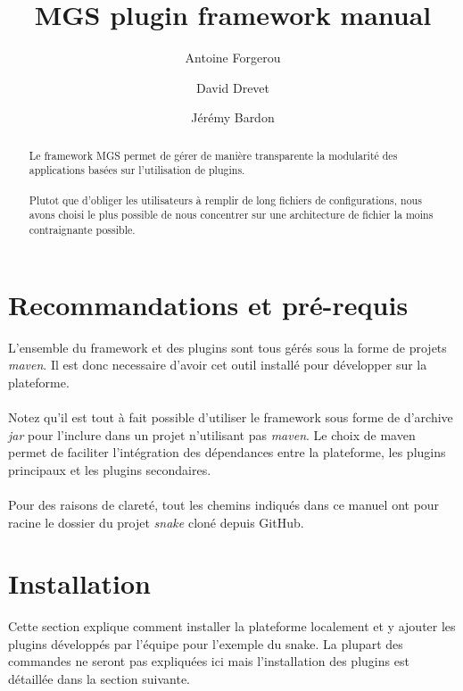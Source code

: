 \documentclass[12pt,a4paper]{article}
\title{MGS plugin framework manual}
\author{Antoine Forgerou \and David Drevet \and Jérémy Bardon}
\date{}
\begin{document}
	\renewcommand{\contentsname}{Sommaire}
	\renewcommand{\arraystretch}{1.8}
	\maketitle	
	
	\vspace{0.80cm}
	\tableofcontents	

	\thispagestyle{empty}	
	\setcounter{page}{0}
	\newpage
	
\begin{abstract}
Le framework MGS permet de gérer de manière transparente la modularité des 
applications basées sur l'utilisation de plugins. 
\\\\
Plutot que d'obliger les utilisateurs à remplir de long fichiers de configurations, 
nous avons choisi le plus possible de nous concentrer sur une architecture de 
fichier la moins contraignante possible.
\end{abstract}

\section{Recommandations et pré-requis}
L'ensemble du framework et des plugins sont tous gérés sous la forme de projets 
\emph{maven}. Il est donc necessaire d'avoir cet outil installé pour développer 
sur la plateforme.
\\\\
Notez qu'il est tout à fait possible d'utiliser le framework sous forme de d'archive 
\emph{jar} pour l'inclure dans un projet n'utilisant pas \emph{maven}. Le choix de 
maven permet de faciliter l'intégration des dépendances entre la plateforme, les 
plugins principaux et les plugins secondaires.
\\\\
Pour des raisons de clareté, tout les chemins indiqués dans ce manuel ont pour racine 
le dossier du projet \emph{snake} cloné depuis GitHub.

\section{Installation}
Cette section explique comment installer la plateforme localement et y ajouter 
les plugins développés par l'équipe pour l'exemple du snake. La plupart des commandes 
ne seront pas expliquées ici mais l'installation des plugins est détaillée dans la 
section suivante.
\end{document}
